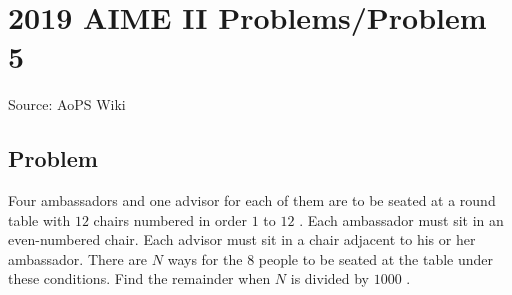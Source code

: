 \documentclass[12pt]{article}
\begin{document}
\section*{{2019 AIME II Problems/Problem 5}}
Source: AoPS Wiki

\subsection*{Problem}
Four ambassadors and one advisor for each of them are to be seated at a round table with $12$ chairs numbered in order $1$ to $12$ . Each ambassador must sit in an even-numbered chair. Each advisor must sit in a chair adjacent to his or her ambassador. There are $N$ ways for the $8$ people to be seated at the table under these conditions. Find the remainder when $N$ is divided by $1000$ .
\end{document}
